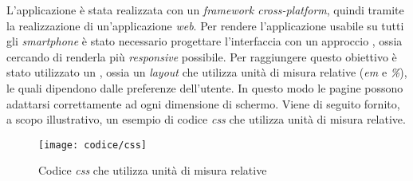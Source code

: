 L'applicazione è stata realizzata con un \textit{framework cross-platform}, quindi tramite la realizzazione di un'applicazione \textit{web}. Per rendere l'applicazione usabile su tutti gli \textit{smartphone} è stato necessario progettare l'interfaccia con un approccio , ossia cercando di renderla più \textit{responsive} possibile. Per raggiungere questo obiettivo è stato utilizzato un , ossia un \textit{layout} che utilizza unità di misura relative (\textit{em} e \textit{\%}), le quali dipendono dalle preferenze dell'utente. In questo modo le pagine possono adattarsi correttamente ad ogni dimensione di schermo. Viene di seguito fornito, a scopo illustrativo, un esempio di codice \textit{css} che utilizza unità di misura relative.

\begin{figure}[!h] 
    \centering 
    \texttt{[image: codice/css]} 
    \caption{Codice \textit{css} che utilizza unità di misura relative}
\end{figure}